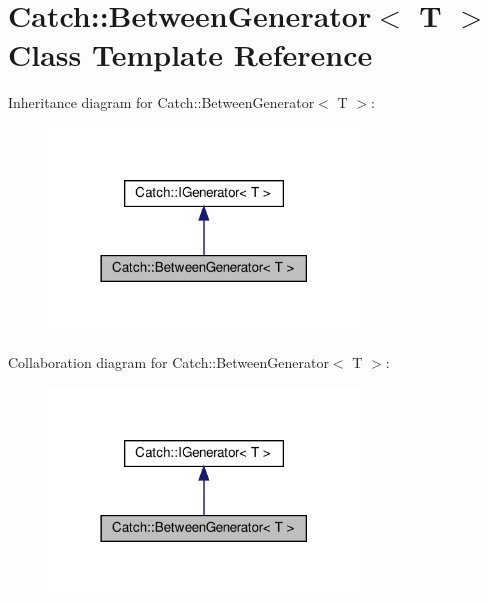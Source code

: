 \hypertarget{classCatch_1_1BetweenGenerator}{}\section{Catch\+:\+:Between\+Generator$<$ T $>$ Class Template Reference}
\label{classCatch_1_1BetweenGenerator}


Inheritance diagram for Catch\+:\+:Between\+Generator$<$ T $>$\+:\nopagebreak
\begin{figure}[H]
\begin{center}
\leavevmode
\includegraphics[width=234pt]{classCatch_1_1BetweenGenerator__inherit__graph}
\end{center}
\end{figure}


Collaboration diagram for Catch\+:\+:Between\+Generator$<$ T $>$\+:\nopagebreak
\begin{figure}[H]
\begin{center}
\leavevmode
\includegraphics[width=234pt]{classCatch_1_1BetweenGenerator__coll__graph}
\end{center}
\end{figure}
